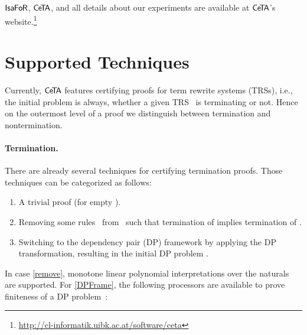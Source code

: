\documentclass[a4paper,final]{easychair}
\theoremstyle{definition}
\newcommand\formatID[1]{\ensuremath{{\sf#1}}}
\newcommand\CeTA{\formatID{C\kern-0.10exe\kern-0.40exT\kern-0.40exA}}
\newcommand\IsaFoR{\formatID{Isa\kern-0.10exF\kern-0.10exo\kern-0.10exR}}
\begin{document}
\IsaFoR{}, \CeTA{}, and all details about our experiments are
available at
\CeTA's website.\footnote{\url{http://cl-informatik.uibk.ac.at/software/ceta}}

\section{Supported Techniques}
\label{sec:techniques}
Currently, \CeTA{} features certifying proofs for term rewrite systems (TRSs),
i.e., the initial problem is always, whether a given TRS~ is terminating or
not. Hence on the outermost level of a proof we distinguish between termination
and nontermination. 

\paragraph{Termination.}
There are already several techniques for certifying termination proofs. Those
techniques can be categorized as follows:
\begin{enumerate}
  \item A trivial proof (for empty ).
  \item\label{remove} Removing some rules~ from~ such that
    termination of  implies termination of  \cite{RTA04}.    
  \item\label{DPFrame} Switching to the dependency pair (DP) framework 
  by applying the DP transformation, resulting in the initial
  DP problem .
\end{enumerate}
In case \ref{remove}, monotone linear polynomial interpretations over the
naturals are supported. For \ref{DPFrame}, the following processors are available
to prove finiteness of a DP problem~:
\end{document}
